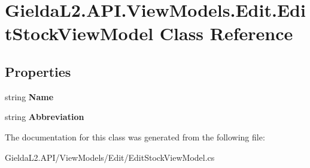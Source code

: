 \hypertarget{class_gielda_l2_1_1_a_p_i_1_1_view_models_1_1_edit_1_1_edit_stock_view_model}{}\section{Gielda\+L2.\+A\+P\+I.\+View\+Models.\+Edit.\+Edit\+Stock\+View\+Model Class Reference}
\label{class_gielda_l2_1_1_a_p_i_1_1_view_models_1_1_edit_1_1_edit_stock_view_model}
\subsection*{Properties}
\begin{DoxyCompactItemize}
\item 
\mbox{\label{class_gielda_l2_1_1_a_p_i_1_1_view_models_1_1_edit_1_1_edit_stock_view_model_a7427909aed1f7b1ecc88a6af91bab2e5}} 
string {\bfseries Name}
\item 
\mbox{\label{class_gielda_l2_1_1_a_p_i_1_1_view_models_1_1_edit_1_1_edit_stock_view_model_a8a462faa2793630042d6aa45c1e4f224}} 
string {\bfseries Abbreviation}
\end{DoxyCompactItemize}


The documentation for this class was generated from the following file\+:\begin{DoxyCompactItemize}
\item 
Gielda\+L2.\+A\+P\+I/\+View\+Models/\+Edit/Edit\+Stock\+View\+Model.\+cs\end{DoxyCompactItemize}
